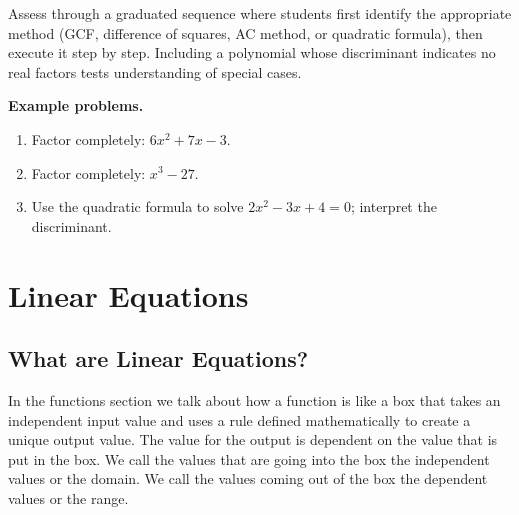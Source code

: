 Assess through a graduated sequence where students first identify the
appropriate method (GCF, difference of squares, AC method, or quadratic
formula), then execute it step by step. Including a polynomial whose
discriminant indicates no real factors tests understanding of special cases.

\textbf{Example problems.}
\begin{enumerate}
    \item Factor completely: $6x^2 + 7x - 3$.
    \item Factor completely: $x^3 - 27$.
    \item Use the quadratic formula to solve $2x^2 - 3x + 4 = 0$; interpret
          the discriminant.
\end{enumerate}



\section{Linear Equations}
\label{sec:line-d9b6}



\subsection{What are Linear Equations?}
\label{sss:what-22ca}




In the functions section we talk about how a function is like a box that takes an
independent input value and uses a rule defined mathematically to create a unique output
value. The value for the output is dependent on the value that is put in the box. We call
the values that are going into the box the independent values or the domain. We call the
values coming out of the box the dependent values or the range.



